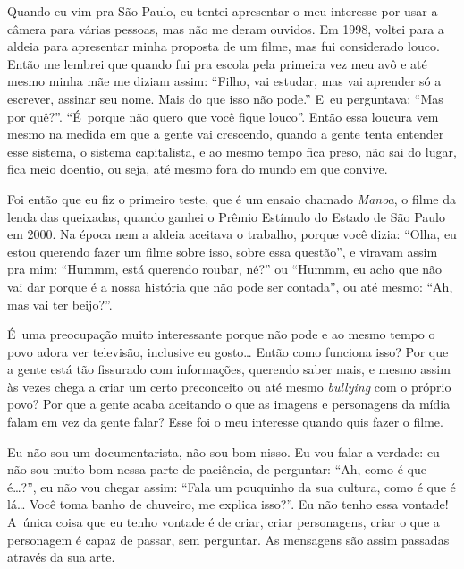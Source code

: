Quando eu vim pra São Paulo, eu tentei apresentar o meu interesse por
usar a câmera para várias pessoas, mas não me deram ouvidos. Em 1998,
voltei para a aldeia para apresentar minha proposta de um filme, mas
fui considerado louco. Então me lembrei que quando fui pra escola pela
primeira vez meu avô e até mesmo minha mãe me diziam assim: ``Filho, vai
estudar, mas vai aprender só a escrever, assinar seu nome. Mais do que
isso não pode.'' E~eu perguntava: ``Mas por quê?''. ``É~porque não quero
que você fique louco''. Então essa loucura vem mesmo na medida em que a
gente vai crescendo, quando a gente tenta entender esse sistema, o
sistema capitalista, e ao mesmo tempo fica preso, não sai do lugar,
fica meio doentio, ou seja, até mesmo fora do mundo em que convive. 

Foi então que eu fiz o primeiro teste, que é um ensaio chamado \emph{Manoa}, o
filme da lenda das queixadas, quando ganhei o Prêmio Estímulo do Estado
de São Paulo em 2000. Na época nem a aldeia aceitava o trabalho, porque
você dizia: ``Olha, eu estou querendo fazer um filme sobre isso, sobre
essa questão'', e viravam assim pra mim: ``Hummm, está querendo roubar,
né?'' ou ``Hummm, eu acho que não vai dar porque é a nossa história que
não pode ser contada'', ou até mesmo: ``Ah, mas vai ter beijo?''.

É~uma preocupação muito interessante porque não pode e ao mesmo tempo o
povo adora ver televisão, inclusive eu gosto\ldots{} Então como funciona
isso? Por que a gente está tão fissurado com informações, querendo
saber mais, e mesmo assim às vezes chega a criar um certo preconceito
ou até mesmo \emph{bullying} com o próprio povo? Por que a gente acaba
aceitando o que as imagens e personagens da mídia falam em vez da gente
falar? Esse foi o meu interesse quando quis fazer o filme.

Eu não sou um documentarista, não sou bom nisso. Eu vou falar a verdade:
eu não sou muito bom nessa parte de paciência, de perguntar: ``Ah, como
é que é\ldots{}?'', eu não vou chegar assim: ``Fala um pouquinho da sua
cultura, como é que é lá\ldots{} Você toma banho de chuveiro, me explica
isso?''. Eu não tenho essa vontade! A~única coisa que eu tenho vontade é
de criar, criar personagens, criar o que a personagem é capaz de
passar, sem perguntar. As mensagens são assim passadas através da sua
arte. 

